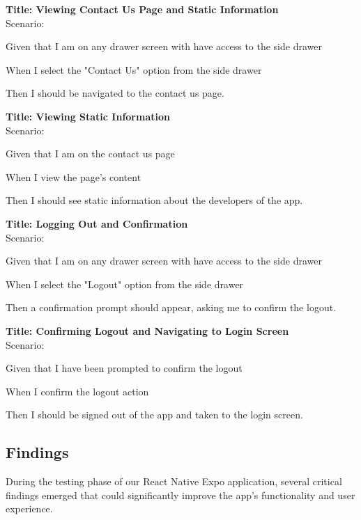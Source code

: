 \bigskip
\textbf{Title: Viewing Contact Us Page and Static Information} \\
Scenario:
\begin{compactitem}
    \item Given that I am on any drawer screen with have access to the side drawer
    \item When I select the "Contact Us" option from the side drawer
    \item Then I should be navigated to the contact us page.
\end{compactitem}

\bigskip
\textbf{Title: Viewing Static Information} \\
Scenario:
\begin{compactitem}
    \item Given that I am on the contact us page
    \item When I view the page's content
    \item Then I should see static information about the developers of the app.
\end{compactitem}

\bigskip
\textbf{Title: Logging Out and Confirmation} \\
Scenario:
\begin{compactitem}
    \item Given that I am on any drawer screen with have access to the side drawer
    \item When I select the "Logout" option from the side drawer
    \item Then a confirmation prompt should appear, asking me to confirm the logout.
\end{compactitem}

\bigskip
\textbf{Title: Confirming Logout and Navigating to Login Screen} \\
Scenario:
\begin{compactitem}
    \item Given that I have been prompted to confirm the logout
    \item When I confirm the logout action
    \item Then I should be signed out of the app and taken to the login screen.
\end{compactitem}

\subsection{Findings}\label{subsec:testing-findings}
During the testing phase of our React Native Expo application, several critical findings emerged that could significantly improve the app's functionality and user experience.

